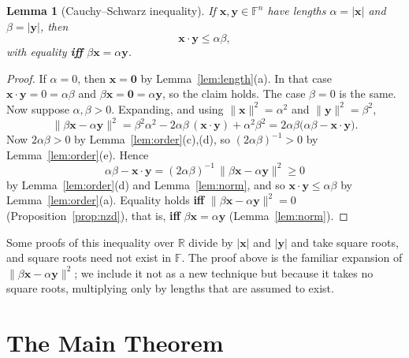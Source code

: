 \documentclass[11pt]{article}
\theoremstyle{plain}
\newtheorem{lemma}[theorem]{Lemma}
\theoremstyle{definition}
\theoremstyle{remark}
\begin{document}
\begin{lemma}[Cauchy--Schwarz inequality]\label{lem:cs}
If $\mathbf{x}, \mathbf{y} \in \mathbb{F}^n$ have lengths $\alpha = |\mathbf{x}|$ and $\beta = |\mathbf{y}|$, then
\begin{equation}
    \mathbf{x} \cdot \mathbf{y} \leq \alpha \beta,
\end{equation}
with equality \textbf{iff} $\beta \mathbf{x} = \alpha \mathbf{y}$.
\end{lemma}
\begin{proof}
If $\alpha = 0$, then $\mathbf{x} = \mathbf{0}$ by Lemma~\ref{lem:length}(a). In that case $\mathbf{x} \cdot \mathbf{y} = 0 = \alpha\beta$ and $\beta \mathbf{x} = \mathbf{0} = \alpha \mathbf{y}$, so the claim holds. The case $\beta = 0$ is the same. Now suppose $\alpha, \beta > 0$. Expanding, and using $\|\mathbf{x}\|^2 = \alpha^2$ and $\|\mathbf{y}\|^2 = \beta^2$,
\begin{equation}
    \|\beta \mathbf{x} - \alpha \mathbf{y}\|^2
    = \beta^2 \alpha^2 - 2\alpha\beta \, (\mathbf{x} \cdot \mathbf{y}) + \alpha^2 \beta^2
    = 2\alpha\beta \bigl(\alpha\beta - \mathbf{x} \cdot \mathbf{y}\bigr).
\end{equation}
Now $2\alpha\beta > 0$ by Lemma~\ref{lem:order}(c),(d), so $(2\alpha\beta)^{-1} > 0$ by Lemma~\ref{lem:order}(e). Hence
\begin{equation}
    \alpha\beta - \mathbf{x} \cdot \mathbf{y} = (2\alpha\beta)^{-1} \, \|\beta \mathbf{x} - \alpha \mathbf{y}\|^2 \geq 0
\end{equation}
by Lemma~\ref{lem:order}(d) and Lemma~\ref{lem:norm}, and so $\mathbf{x} \cdot \mathbf{y} \leq \alpha\beta$ by Lemma~\ref{lem:order}(a). Equality holds \textbf{iff} $\|\beta \mathbf{x} - \alpha \mathbf{y}\|^2 = 0$ (Proposition~\ref{prop:nzd}), that is, \textbf{iff} $\beta \mathbf{x} = \alpha \mathbf{y}$ (Lemma~\ref{lem:norm}).
\end{proof}

Some proofs of this inequality over $\mathbb{R}$ divide by $|\mathbf{x}|$ and $|\mathbf{y}|$ and take square roots, and square roots need not exist in $\mathbb{F}$. The proof above is the familiar expansion of $\|\beta\mathbf{x} - \alpha\mathbf{y}\|^2$; we include it not as a new technique but because it takes no square roots, multiplying only by lengths that are assumed to exist.

\section{The Main Theorem}
\end{document}
